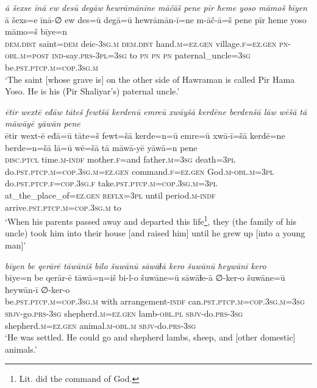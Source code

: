 \ea \label{ZP.6}
\textit{ā šexse īnā ew desū degāw hewrāmānīne māčāš pene pīr ħeme yoso māmoš bīyen} \\ 
\gll ā šexs=e īnā-∅ ew des=ū degā=ū hewrāmān-ī=ne m-āč-ā=š pene pīr ħeme yoso māmo=š bīye=n \\ 
 \textsc{dem.dist} saint\textsc{=dem} deic\textsc{-3sg}\textsc{.m} \textsc{dem.dist} hand\textsc{.m}\textsc{\textsc{=ez.gen}} village\textsc{.f}\textsc{\textsc{=ez.gen}} \textsc{pn}\textsc{-obl}\textsc{.m}\textsc{=\textsc{post}} \textsc{ind-}say\textsc{.prs}\textsc{-3pl}\textsc{=3sg} to \textsc{pn} \textsc{pn} \textsc{pn} paternal\_uncle\textsc{=3sg} be\textsc{.pst}\textsc{.ptcp}\textsc{.m}\textsc{=cop}\textsc{.3sg}\textsc{.m} \\ 
\glt `The saint [whose grave is] on the other side of Hawraman is called Pir Hama Yoso. He is his (Pir Shaliyar’s) paternal uncle.'
\z 
 
\ea \label{ZP.8}
\textit{ētir wextē eđāw tāteš fewtšā kerdenū emreū xwāyšā kerdēne berdenšā lāw wēšā tā māwāyē yāwān pene} \\ 
\gll ētir wext-ē eđā=ū tāte=š fewt=šā kerde=n=ū emre=ū xwā-ī=šā kerdē=ne berde=n=šā lā=ū wē=šā tā māwā-yē yāwā=n pene \\ 
 \textsc{disc.ptcl} time\textsc{.m}\textsc{-indf} mother\textsc{.f}=and father\textsc{.m}\textsc{=3sg} death\textsc{=3pl} do\textsc{.pst}\textsc{.ptcp}\textsc{.m}\textsc{=cop}\textsc{.3sg}\textsc{.m}\textsc{\textsc{=ez.gen}} command\textsc{.f}\textsc{\textsc{=ez.gen}} God\textsc{.m}\textsc{-obl}\textsc{.m}\textsc{=3pl} do\textsc{.pst}\textsc{.ptcp}\textsc{.f}\textsc{=cop}\textsc{.3sg}\textsc{.f} take\textsc{.pst}\textsc{.ptcp}\textsc{.m}\textsc{=cop}\textsc{.3sg}\textsc{.m}\textsc{=3pl} at\_the\_place\_of\textsc{\textsc{=ez.gen}} \textsc{reflx}\textsc{=3pl} until period\textsc{.m}\textsc{-indf} arrive\textsc{.pst}\textsc{.ptcp}\textsc{.m}\textsc{=cop}\textsc{.3sg}\textsc{.m} to \\ 
\glt `When his parents passed away and departed this life\footnote{Lit. did the command of God.}, they (the family of his uncle) took him into their house [and raised him] until he grew up [into a young man]'
\z 
 
\ea \label{ZP.9}
\textit{bīyen be qerārē tāwāniš bilo šuwānū sāwāɫā kero šuwānū ħeywānī kero} \\ 
\gll bīye=n be qerār-ē tāwā=n=iš bi-l-o šuwāne=ū sāwāɫe-ā ∅-ker-o šuwāne=ū ħeywān-ī ∅-ker-o \\ 
 be\textsc{.pst}\textsc{.ptcp}\textsc{.m}\textsc{=cop}\textsc{.3sg}\textsc{.m} with arrangement\textsc{-indf} can\textsc{.pst}\textsc{.ptcp}\textsc{.m}\textsc{=cop}\textsc{.3sg}\textsc{.m}\textsc{=3sg} \textsc{sbjv-}go\textsc{.prs}\textsc{-3sg} shepherd\textsc{.m}\textsc{\textsc{=ez.gen}} lamb\textsc{-obl}\textsc{.pl} \textsc{sbjv-}do\textsc{.prs}\textsc{-3sg} shepherd\textsc{.m}\textsc{\textsc{=ez.gen}} animal\textsc{.m}\textsc{-obl}\textsc{.m} \textsc{sbjv-}do\textsc{.prs}\textsc{-3sg} \\ 
\glt `He was settled. He could go and shepherd lambs, sheep, and [other domestic] animals.'
\z 
 
